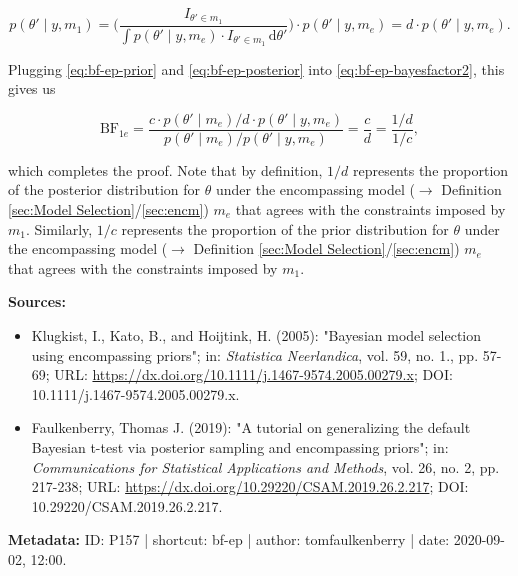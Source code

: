 \documentclass[a4paper,12pt,twoside]{book}
\begin{document}
\begin{equation} \label{eq:bf-ep-posterior}
  p(\theta' \mid y,m_1) = \Biggl(\frac{I_{\theta' \in m_1}}{\int p(\theta' \mid y,m_e) \cdot I_{\theta' \in m_1} \, \mathrm{d}\theta'}\Biggr)\cdot p(\theta' \mid y,m_e) = d \cdot p(\theta' \mid y,m_e).
\end{equation}

Plugging \eqref{eq:bf-ep-prior} and \eqref{eq:bf-ep-posterior} into \eqref{eq:bf-ep-bayesfactor2}, this gives us

\begin{equation} \label{eq:bf-ep-bayesfactor3}
  \text{BF}_{1e} = \frac{c \cdot p(\theta' \mid m_e) / d \cdot p(\theta' \mid y,m_e)}{p(\theta' \mid m_e) / p(\theta' \mid y,m_e)} = \frac{c}{d} = \frac{1/d}{1/c},
\end{equation}

which completes the proof. Note that by definition, $1/d$ represents the proportion of the posterior distribution for $\theta$ under the encompassing model ($\rightarrow$ Definition \ref{sec:Model Selection}/\ref{sec:encm}) $m_e$ that agrees with the constraints imposed by $m_1$.  Similarly, $1/c$ represents the proportion of the prior distribution for $\theta$ under the encompassing model ($\rightarrow$ Definition \ref{sec:Model Selection}/\ref{sec:encm}) $m_e$ that agrees with the constraints imposed by $m_1$.


\vspace{1em}
\textbf{Sources:}
\begin{itemize}
\item Klugkist, I., Kato, B., and Hoijtink, H. (2005): "Bayesian model selection using encompassing priors"; in: \textit{Statistica Neerlandica}, vol. 59, no. 1., pp. 57-69; URL: \url{https://dx.doi.org/10.1111/j.1467-9574.2005.00279.x}; DOI: 10.1111/j.1467-9574.2005.00279.x.
\item Faulkenberry, Thomas J. (2019): "A tutorial on generalizing the default Bayesian t-test via posterior sampling and encompassing priors"; in: \textit{Communications for Statistical Applications and Methods}, vol. 26, no. 2, pp. 217-238; URL: \url{https://dx.doi.org/10.29220/CSAM.2019.26.2.217}; DOI: 10.29220/CSAM.2019.26.2.217.
\end{itemize}


\vspace{1em}
\textbf{Metadata:} ID: P157 | shortcut: bf-ep | author: tomfaulkenberry | date: 2020-09-02, 12:00.
\vspace{1em}
\end{document}
